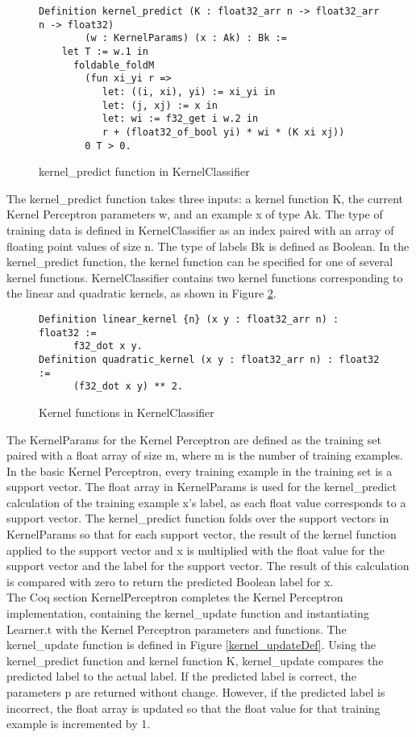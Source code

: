 \begin{figure}
    \caption{kernel\_predict function in KernelClassifier}
    \label{kernel_predictDef}
    \begin{lstlisting}
Definition kernel_predict (K : float32_arr n -> float32_arr n -> float32) 
        (w : KernelParams) (x : Ak) : Bk :=
    let T := w.1 in 
      foldable_foldM
        (fun xi_yi r =>
           let: ((i, xi), yi) := xi_yi in
           let: (j, xj) := x in 
           let: wi := f32_get i w.2 in 
           r + (float32_of_bool yi) * wi * (K xi xj))
        0 T > 0.
    \end{lstlisting}
\end{figure}

The kernel\_predict function takes three inputs: a kernel function K, the current Kernel Perceptron parameters w, and an example x of type Ak. The type of training data is defined in KernelClassifier as an index paired with an array of floating point values of size n. The type of labels Bk is defined as Boolean. In the kernel\_predict function, the kernel function can be specified for one of several kernel functions. KernelClassifier contains two kernel functions corresponding to the linear and quadratic kernels, as shown in Figure \ref{kernelfunctionsDef}.

\begin{figure}
    \caption{Kernel functions in KernelClassifier}
    \label{kernelfunctionsDef}
    \begin{lstlisting}
Definition linear_kernel {n} (x y : float32_arr n) : float32 :=
      f32_dot x y.
Definition quadratic_kernel (x y : float32_arr n) : float32 :=
      (f32_dot x y) ** 2.
    \end{lstlisting}
\end{figure}

The KernelParams for the Kernel Perceptron are defined as the training set paired with a float array of size m, where m is the number of training examples. In the basic Kernel Perceptron, every training example in the training set is a support vector. The float array in KernelParams is used for the kernel\_predict calculation of the training example x's label, as each float value corresponds to a support vector. The kernel\_predict function folds over the support vectors in KernelParams so that for each support vector, the result of the kernel function applied to the support vector and x is multiplied with the float value for the support vector and the label for the support vector. The result of this calculation is compared with zero to return the predicted Boolean label for x. 
\\The Coq section KernelPerceptron completes the Kernel Perceptron implementation, containing the kernel\_update function and instantiating Learner.t with the Kernel Perceptron parameters and functions. The kernel\_update function is defined in Figure \ref{kernel_updateDef}. Using the kernel\_predict function and kernel function K, kernel\_update compares the predicted label to the actual label. If the predicted label is correct, the parameters p are returned without change. However, if the predicted label is incorrect, the float array is updated so that the float value for that training example is incremented by 1. 

